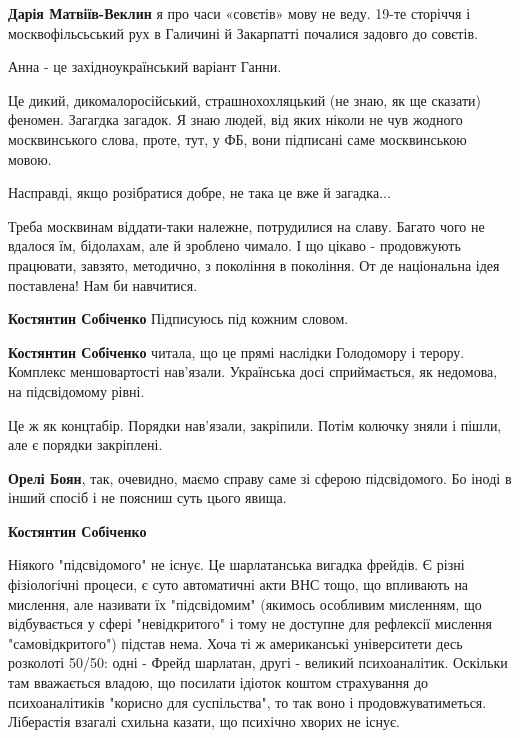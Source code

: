\begin{itemize}
\begin{itemize}
\textbf{Дарія Матвіїв-Веклин} я про часи «совєтів» мову не веду. 19-те сторіччя і москвофільсьський рух в Галичині й Закарпатті почалися задовго до совєтів.

Анна - це західноукраїнський варіант Ганни.

\end{itemize} %


Це дикий, дикомалоросійський, страшнохохляцький (не знаю, як ще сказати)
феномен. Загагдка загадок. Я знаю людей, від яких ніколи не чув жодного
москвинського слова, проте, тут, у ФБ, вони підписані саме москвинською мовою.

Насправді, якщо розібратися добре, не така це вже й загадка...

Треба москвинам віддати-таки належне, потрудилися на славу. Багато чого не
вдалося їм, бідолахам, але й зроблено чимало. І що цікаво - продовжують
працювати, завзято, методично, з покоління в покоління. От де національна ідея
поставлена! Нам би навчитися.

\begin{itemize} %
\textbf{Костянтин Собіченко} Підписуюсь під кожним словом.

\textbf{Костянтин Собіченко} читала, що це прямі наслідки Голодомору і терору. Комплекс меншовартості нав'язали. Українська досі сприймається, як недомова, на підсвідомому рівні.

Це ж як концтабір. Порядки нав'язали, закріпили. Потім колючку зняли і пішли, але є порядки закріплені.

\textbf{Орелі Боян}, так, очевидно, маємо справу саме зі сферою підсвідомого. Бо іноді в інший спосіб і не поясниш суть цього явища.

\textbf{Костянтин Собіченко} 

Ніякого "підсвідомого" не існує. Це шарлатанська вигадка фрейдів. Є різні
фізіологічні процеси, є суто автоматичні акти ВНС тощо, що впливають на
мислення, але називати їх "підсвідомим" (якимось особливим мисленням, що
відбувається у сфері "невідкритого" і тому не доступне для рефлексії мислення
"самовідкритого") підстав нема. Хоча ті ж американські університети десь
розколоті 50/50: одні - Фрейд шарлатан, другі - великий психоаналітик. Оскільки
там вважається владою, що посилати ідіоток коштом страхування до
психоаналітиків "корисно для суспільства", то так воно і продовжуватиметься.
Ліберастія взагалі схильна казати, що психічно хворих не існує.


\end{itemize}
\end{itemize}

